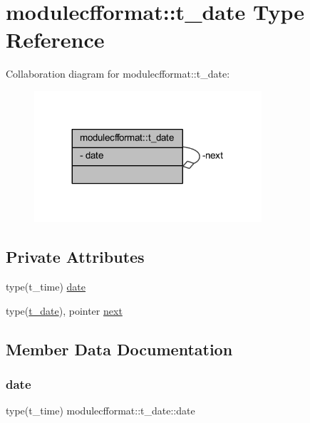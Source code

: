\hypertarget{structmodulecfformat_1_1t__date}{}\section{modulecfformat\+:\+:t\+\_\+date Type Reference}
\label{structmodulecfformat_1_1t__date}


Collaboration diagram for modulecfformat\+:\+:t\+\_\+date\+:\nopagebreak
\begin{figure}[H]
\begin{center}
\leavevmode
\includegraphics[width=239pt]{structmodulecfformat_1_1t__date__coll__graph}
\end{center}
\end{figure}
\subsection*{Private Attributes}
\begin{DoxyCompactItemize}
\item 
type(t\+\_\+time) \mbox{\hyperlink{structmodulecfformat_1_1t__date_a0bcdb5c9be4f2b266bcbb98d46cad9c9}{date}}
\item 
type(\mbox{\hyperlink{structmodulecfformat_1_1t__date}{t\+\_\+date}}), pointer \mbox{\hyperlink{structmodulecfformat_1_1t__date_a54d9d7d74e23247529d049058c498d2c}{next}}
\end{DoxyCompactItemize}


\subsection{Member Data Documentation}
\mbox{\label{structmodulecfformat_1_1t__date_a0bcdb5c9be4f2b266bcbb98d46cad9c9}} 
\subsubsection{\texorpdfstring{date}{date}}
{\footnotesize\ttfamily type(t\+\_\+time) modulecfformat\+::t\+\_\+date\+::date\hspace{0.3cm}{\ttfamily [private]}}

